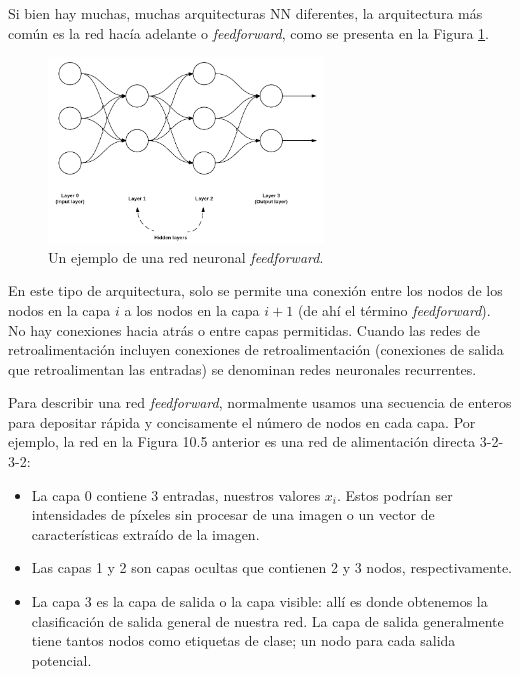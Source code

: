 \documentclass[a4paper,12pt]{article}
\begin{document}
Si bien hay muchas, muchas arquitecturas NN diferentes, la arquitectura más común es la red hacía adelante o \textit{feedforward}, como se presenta en la Figura \ref{fig:nnff}.

\begin{figure}[H]
	\begin{center}				
	\includegraphics[width=0.65\textwidth]{022.png}
  	\caption{Un ejemplo de una red neuronal \textit{feedforward}.}
  	\label{fig:nnff}
  	\end{center}
\end{figure}

En este tipo de arquitectura, solo se permite una conexión entre los nodos de los nodos en la capa $i$ a los nodos en la capa $i + 1$ (de ahí el término \textit{feedforward}). No hay conexiones hacia atrás o entre capas permitidas. Cuando las redes de retroalimentación incluyen conexiones de retroalimentación (conexiones de salida que retroalimentan las entradas) se denominan redes neuronales recurrentes.

Para describir una red \textit{feedforward}, normalmente usamos una secuencia de enteros para depositar rápida y concisamente el número de nodos en cada capa. Por ejemplo, la red en la Figura 10.5 anterior es una red de alimentación directa 3-2-3-2:

\begin{itemize}[noitemsep, topsep=2pt]
\item La capa 0 contiene 3 entradas, nuestros valores $x_i$. Estos podrían ser intensidades de píxeles sin procesar de una imagen o un vector de características extraído de la imagen.
\item Las capas 1 y 2 son capas ocultas que contienen 2 y 3 nodos, respectivamente.
\item La capa 3 es la capa de salida o la capa visible: allí es donde obtenemos la clasificación de salida general de nuestra red. La capa de salida generalmente tiene tantos nodos como etiquetas de clase; un nodo para cada salida potencial.
\end{itemize}
\end{document}
